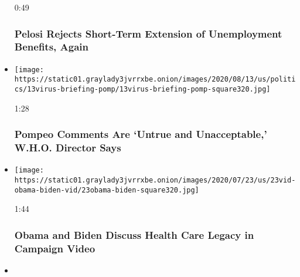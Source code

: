 \begin{itemize}
  0:49

  \hypertarget{pelosi-rejects-short-term-extension-of-unemployment-benefits-again}{%
  \subsubsection{Pelosi Rejects Short-Term Extension of Unemployment
  Benefits,
  Again}\label{pelosi-rejects-short-term-extension-of-unemployment-benefits-again}}
\item
  \href{https://www.nytimes3xbfgragh.onion/video/world/100000007253595/world-health-organization-pompeo-china.html?action=click\&module=video-series-bar\&region=header\&pgtype=Article\&playlistId=video/coronavirus-news-update}{}

  \texttt{[image: https://static01.graylady3jvrrxbe.onion/images/2020/08/13/us/politics/13virus-briefing-pomp/13virus-briefing-pomp-square320.jpg]}

  1:28

  \hypertarget{pompeo-comments-are-untrue-and-unacceptable-who-director-says}{%
  \subsubsection{Pompeo Comments Are `Untrue and Unacceptable,' W.H.O.
  Director
  Says}\label{pompeo-comments-are-untrue-and-unacceptable-who-director-says}}
\item
  \href{https://www.nytimes3xbfgragh.onion/video/us/politics/100000007253264/obama-biden-conversation.html?action=click\&module=video-series-bar\&region=header\&pgtype=Article\&playlistId=video/coronavirus-news-update}{}

  \texttt{[image: https://static01.graylady3jvrrxbe.onion/images/2020/07/23/us/23vid-obama-biden-vid/23obama-biden-square320.jpg]}

  1:44

  \hypertarget{obama-and-biden-discuss-health-care-legacy-in-campaign-video}{%
  \subsubsection{Obama and Biden Discuss Health Care Legacy in Campaign
  Video}\label{obama-and-biden-discuss-health-care-legacy-in-campaign-video}}
\item
  \href{https://www.nytimes3xbfgragh.onion/video/world/europe/100000007251464/niagara-falls-tour-boats.html?action=click\&module=video-series-bar\&region=header\&pgtype=Article\&playlistId=video/coronavirus-news-update}{}


\end{itemize}

